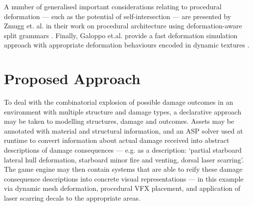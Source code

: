 \documentclass[11pt]{report}
\begin{document}
			A number of generalised important considerations relating to procedural deformation --- such as the potential of self-intersection --- are presented by Zmugg et. al. in their work on procedural architecture using deformation-aware split grammars \cite{zmugg2013procedural}. Finally, Galoppo et.al. provide a fast deformation simulation approach with appropriate deformation behaviours encoded in dynamic textures \cite{galoppo2006fast}.


\chapter{Proposed Approach} \label{chap:prop_app}
	To deal with the combinatorial explosion of possible damage outcomes in an environment with multiple structure and damage types, a declarative approach may be taken to modelling structures, damage and outcomes. Assets may be annotated with material and structural information, and an ASP solver used at runtime to convert information about actual damage received into abstract descriptions of damage consequences --- e.g. as a description: `partial starboard lateral hull deformation, starboard minor fire and venting, dorsal laser scarring'. The game engine may then contain systems that are able to reify these damage consequence descriptions into concrete visual representations --- in this example via dynamic mesh deformation, procedural VFX placement, and application of laser scarring decals to the appropriate areas.

\end{document}
